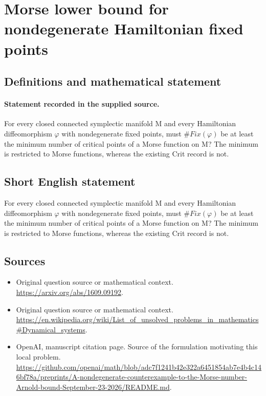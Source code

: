 \documentclass[11pt]{article}
\begin{document}
\section*{Morse lower bound for nondegenerate Hamiltonian fixed points}\label{30007134}
\subsection{Definitions and mathematical statement}
\paragraph{Statement recorded in the supplied source.}
For every closed connected symplectic manifold M and every Hamiltonian diffeomorphism $\varphi $ with nondegenerate fixed points, must $\#Fix(\varphi )$ be at least the minimum number of critical points of a Morse function on M? The minimum is restricted to Morse functions, whereas the existing Crit record is not.
\subsection{Short English statement}
For every closed connected symplectic manifold M and every Hamiltonian diffeomorphism $\varphi $ with nondegenerate fixed points, must $\#Fix(\varphi )$ be at least the minimum number of critical points of a Morse function on M? The minimum is restricted to Morse functions, whereas the existing Crit record is not.
\subsection{Sources}
\begin{itemize}
\item[S1] Original question source or mathematical context.
\url{https://arxiv.org/abs/1609.09192}.
\item[S2] Original question source or mathematical context.
\url{https://en.wikipedia.org/wiki/List_of_unsolved_problems_in_mathematics#Dynamical_systems}.
\item[S3] OpenAI, manuscript citation page. Source of the formulation motivating this local problem.
\url{https://github.com/openai/math/blob/adc7f1241b42e322a6451854ab7e4b4c146bf78a/preprints/A-nondegenerate-counterexample-to-the-Morse-number-Arnold-bound-September-23-2026/README.md}.
\end{itemize}
\end{document}
